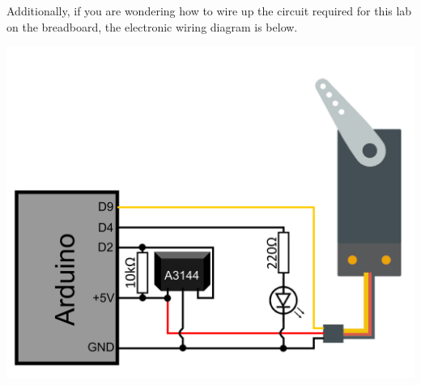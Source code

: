 \documentclass[11pt,a4paper]{article}
\begin{document}
\vspace{2em}

\noindent
Additionally, if you are wondering how to wire up the circuit required for this lab on the breadboard, the electronic wiring diagram is below.

\begin{center}
    \includegraphics[width=.6\textwidth]{./images/wiring-diagram.png}
\end{center}
\end{document}
